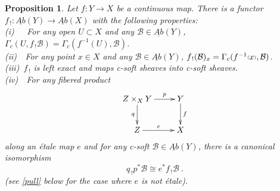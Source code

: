 \documentclass[a4paper]{article}
\newtheorem{prop}[st]{Proposition}
\newcommand{\rmap}{\longrightarrow}
\newcommand{\B}{\ensuremath{\mathcal{B}}}
\newcommand{\gc}{\ensuremath{\Gamma_c}}
\newcommand{\ps}{{\raise 1pt\hbox{\tiny (}}}
\newcommand{\pd}{{\raise 1pt\hbox{\tiny )}}}
\begin{document}


\begin{prop}
\label{losr}
Let $f: Y\rmap X$ be a continuous map. There is a functor $f_{\, !}: \underline{Ab}(Y) \rmap \underline{Ab}(X)$ with the following properties: \\
 \hspace*{.3in} \ps i\pd\ \ \ For any open $U \subset X$ and any $\B \in \underline{Ab}(Y)$, $\gc (U, f_{\, !}\B) = \gc (f^{-1}(U), \B)$.\\
 \hspace*{.3in} \ps ii\pd\ \ For any point $x\in X$ and any $\B \in \underline{Ab}(Y)$, $f_{\, !}(\B)_{x} = \gc(f^{-1}\ps x\pd, \B)$.\\
 \hspace*{.3in} \ps iii\pd\ $f_{\, !}$ is left exact and maps c-soft sheaves into c-soft sheaves.\\
 \hspace*{.3in} \ps iv\pd\ \ For any fibered product
\[ \xymatrix{
Z\times_{X}Y \ar[d]_-{q}\ar[r]^-{p} & Y \ar[d]^-{f}\\
Z\ar[r]^-{e} & X } \]
along an \'etale map $e$ and for any c-soft $\B\in \underline{Ab}(Y)$, there is a canonical isomorphism
\[ q_{\, !}p^{*}\B \cong e^{*}f_{\, !}\B \ .\]
(see \ref{pull} below for the case where $e$ is not \'etale).
\end{prop}
\end{document}
